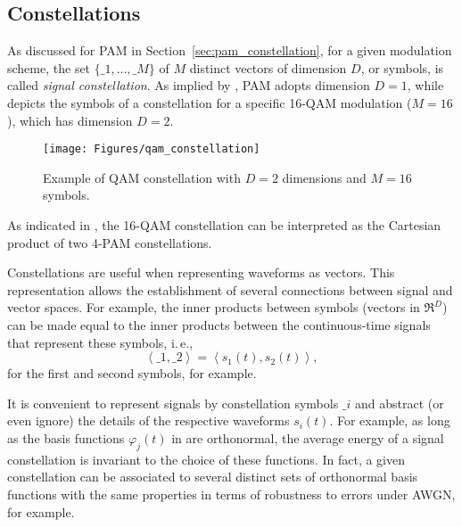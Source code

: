 \subsection{Constellations}

As discussed for PAM in Section~\ref{sec:pam_constellation}, for a given modulation scheme, the set $\{ \bm_1, \ldots, \bm_M \}$ of $M$ distinct vectors of dimension $D$, or symbols, is called \emph{signal constellation}.
As implied by , PAM adopts dimension $D=1$, while
  depicts the symbols of a constellation for a specific 16-QAM modulation ($M=16$), which has dimension $D=2$.

\begin{figure}[htbp]
	\centering
		\texttt{[image: Figures/qam\_constellation]}		
	\caption{Example of QAM constellation with $D=2$ dimensions and $M=16$ symbols.\label{fig:qam_constellation}}
\end{figure}

As indicated in , the 16-QAM constellation can be interpreted as the 
Cartesian product of two 4-PAM constellations.

Constellations are useful when representing waveforms as vectors. This representation allows the establishment of several connections between signal and vector spaces. For example, the inner products between symbols (vectors in $\Re^D$) can be made equal to the inner products between the continuous-time signals that represent these symbols, i.\,e.,
\[
\left< \bm_1, \bm_2 \right> = \left< s_1(t), s_2(t) \right>,
\]
for the first and second symbols, for example.



It is convenient to represent signals by constellation symbols $\bm_i$ and abstract (or even ignore) the details of the respective waveforms $s_i(t)$. For example, as long as the basis functions $\varphi_j(t)$ in  are orthonormal,
the average energy of a signal constellation is invariant to the choice of
these functions. In fact, a given constellation can be associated to several distinct sets of orthonormal basis functions with the same properties in terms of robustness to errors under AWGN, for example. 

